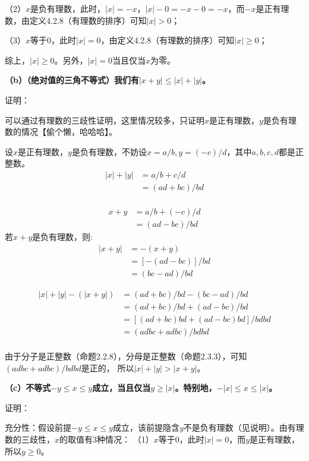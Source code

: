 \documentclass{article}
\theoremstyle{mystyle}
\begin{document}
（2）$x$是负有理数，此时，$|x|=-x$，$|x|-0=-x-0=-x$，而$-x$是正有理数，由定义4.2.8（有理数的排序）可知$|x|>0$；

（3）$x$等于0，此时$|x|=0$，由定义4.2.8（有理数的排序）可知$|x| \geq 0$；

综上，$|x| \geq 0$。另外，$|x|=0$当且仅当$x$为零。

\textbf{（b）（绝对值的三角不等式）我们有$|x+y| \leq |x| + |y|$。}

证明：

可以通过有理数的三歧性证明，这里情况较多，只证明$x$是正有理数，$y$是负有理数的情况【偷个懒，哈哈哈】。

设$x$是正有理数，$y$是负有理数，不妨设$x=a/b,y=(-c)/d$，其中$a,b,c,d$都是正整数。
\begin{align*}
  |x| + |y| & = a/b + c/d  \\
            & = (ad+bc)/bd \\
\end{align*}

\begin{align*}
  x + y & = a/b + (-c)/d \\
        & = (ad-bc)/bd
\end{align*}
若$x + y$是负有理数，则:
\begin{align*}
  |x+y| & =-(x+y)        \\
        & =[-(ad-bc)]/bd \\
        & =(bc-ad)/bd
\end{align*}

\begin{align*}
  |x|+|y| - (|x+y|) & = (ad+bc)/bd - (bc-ad)/bd    \\
                    & = (ad+bc)/bd + (ad-bc)/bd    \\
                    & = [(ad+bc)bd+(ad-bc)bd]/bdbd \\
                    & = (adbc+adbc) / bdbd         \\
\end{align*}

由于分子是正整数（命题2.2.8），分母是正整数（命题2.3.3），可知$(adbc+adbc) / bdbd$是正的，
所以$ |x| + |y| > |x+y|$。

\textbf{（c）不等式$-y \leq x \leq y$成立，当且仅当$y \geq |x|$。特别地，$-|x| \leq x \leq |x|$。}

证明：

充分性：假设前提$-y \leq x \leq y$成立，该前提隐含$y$不是负有理数（见说明）。由有理数的三歧性，$x$的取值有3种情况：
（1）$x$等于0，此时$|x|=0$，而$y$是正有理数，所以$y \geq 0$。
\end{document}
